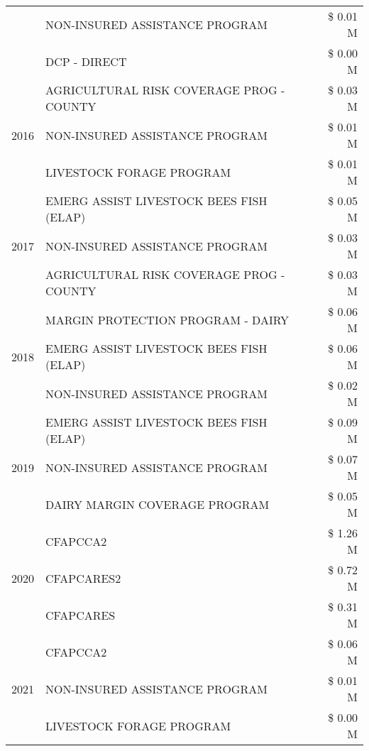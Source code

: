 \begin{tabular}{llr}
 & NON-INSURED ASSISTANCE PROGRAM & \$ 0.01 M \\
 & DCP - DIRECT & \$ 0.00 M \\
\cline{1-3}
\multirow[t]{3}{*}{2016} & AGRICULTURAL RISK COVERAGE PROG - COUNTY & \$ 0.03 M \\
 & NON-INSURED ASSISTANCE PROGRAM & \$ 0.01 M \\
 & LIVESTOCK FORAGE PROGRAM & \$ 0.01 M \\
\cline{1-3}
\multirow[t]{3}{*}{2017} & EMERG ASSIST LIVESTOCK BEES FISH (ELAP) & \$ 0.05 M \\
 & NON-INSURED ASSISTANCE PROGRAM & \$ 0.03 M \\
 & AGRICULTURAL RISK COVERAGE PROG - COUNTY & \$ 0.03 M \\
\cline{1-3}
\multirow[t]{3}{*}{2018} & MARGIN PROTECTION PROGRAM - DAIRY & \$ 0.06 M \\
 & EMERG ASSIST LIVESTOCK BEES FISH (ELAP) & \$ 0.06 M \\
 & NON-INSURED ASSISTANCE PROGRAM & \$ 0.02 M \\
\cline{1-3}
\multirow[t]{3}{*}{2019} & EMERG ASSIST LIVESTOCK BEES FISH (ELAP) & \$ 0.09 M \\
 & NON-INSURED ASSISTANCE PROGRAM & \$ 0.07 M \\
 & DAIRY MARGIN COVERAGE PROGRAM & \$ 0.05 M \\
\cline{1-3}
\multirow[t]{3}{*}{2020} & CFAPCCA2 & \$ 1.26 M \\
 & CFAPCARES2 & \$ 0.72 M \\
 & CFAPCARES & \$ 0.31 M \\
\cline{1-3}
\multirow[t]{3}{*}{2021} & CFAPCCA2 & \$ 0.06 M \\
 & NON-INSURED ASSISTANCE PROGRAM & \$ 0.01 M \\
 & LIVESTOCK FORAGE PROGRAM & \$ 0.00 M \\
\cline{1-3}
\bottomrule
\end{tabular}
